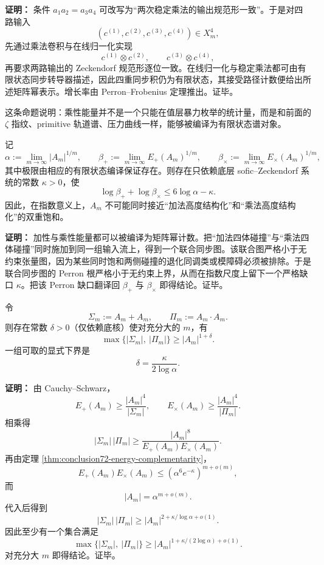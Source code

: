 \textbf{证明：}
条件 \(a_1a_2=a_3a_4\) 可改写为“两次稳定乘法的输出规范形一致”。于是对四路输入
\[
(c^{(1)},c^{(2)},c^{(3)},c^{(4)})\in X_m^4,
\]
先通过乘法卷积与在线归一化实现
\[
c^{(1)}\otimes c^{(2)},\qquad c^{(3)}\otimes c^{(4)},
\]
再要求两路输出的 Zeckendorf 规范形逐位一致。在线归一化与稳定乘法都可由有限状态同步转导器描述，因此四重同步积仍为有限状态，其接受路径计数便给出所述矩阵幂表示。增长率由 Perron--Frobenius 定理推出。证毕。

这条命题说明：乘性能量并不是一个只能在值层暴力枚举的统计量，而是和前面的 \(\zeta\) 指纹、primitive 轨道谱、压力曲线一样，能够被编译为有限状态谱对象。

\begin{theorem}[加性与乘性能量的谱互补]\label{thm:conclusion72-energy-complementarity}
记
\[
\alpha:=\lim_{m\to\infty}|A_m|^{1/m},
\qquad
\beta_+:=\lim_{m\to\infty}E_+(A_m)^{1/m},
\qquad
\beta_\times:=\lim_{m\to\infty}E_\times(A_m)^{1/m},
\]
其中极限由相应的有限状态编译保证存在。则存在只依赖底层 sofic--Zeckendorf 系统的常数 \(\kappa>0\)，使
\[
\log \beta_+ + \log \beta_\times \le 6\log \alpha-\kappa.
\]
因此，在指数意义上，\(A_m\) 不可能同时接近“加法高度结构化”和“乘法高度结构化”的双重饱和。
\end{theorem}

\textbf{证明：}
加性与乘性能量都可以被编译为矩阵幂计数。把“加法四体碰撞”与“乘法四体碰撞”同时施加到同一组输入流上，得到一个联合同步图。该联合图严格小于无约束张量图，因为某些同时饱和两侧碰撞的退化同调类或模障碍必须被排除。于是联合同步图的 Perron 根严格小于无约束上界，从而在指数尺度上留下一个严格缺口 \(\kappa\)。把该 Perron 缺口翻译回 \(\beta_+\) 与 \(\beta_\times\) 即得结论。证毕。

\begin{corollary}\label{cor:conclusion73-sumproduct-exponential-law}
令
\[
\Sigma_m:=A_m+A_m,
\qquad
\Pi_m:=A_m\cdot A_m.
\]
则存在常数 \(\delta>0\)（仅依赖底核）使对充分大的 \(m\)，有
\[
\max\{|\Sigma_m|,\ |\Pi_m|\}\ge |A_m|^{1+\delta}.
\]
一组可取的显式下界是
\[
\delta=\frac{\kappa}{2\log \alpha}.
\]
\end{corollary}

\textbf{证明：}
由 Cauchy--Schwarz，
\[
E_+(A_m)\ge \frac{|A_m|^4}{|\Sigma_m|},
\qquad
E_\times(A_m)\ge \frac{|A_m|^4}{|\Pi_m|}.
\]
相乘得
\[
|\Sigma_m|\,|\Pi_m|
\ge
\frac{|A_m|^8}{E_+(A_m)E_\times(A_m)}.
\]
再由定理 \ref{thm:conclusion72-energy-complementarity}，
\[
E_+(A_m)E_\times(A_m)
\le
(\alpha^6 e^{-\kappa})^{m+o(m)},
\]
而
\[
|A_m|=\alpha^{m+o(m)}.
\]
代入后得到
\[
|\Sigma_m|\,|\Pi_m|
\ge
|A_m|^{2+\kappa/\log \alpha+o(1)}.
\]
因此至少有一个集合满足
\[
\max\{|\Sigma_m|,\ |\Pi_m|\}\ge |A_m|^{1+\kappa/(2\log \alpha)+o(1)}.
\]
对充分大 \(m\) 即得结论。证毕。


